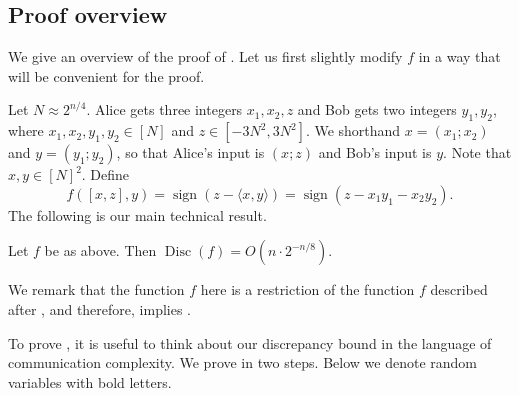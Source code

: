 \documentclass{toc}
\DeclareMathOperator{\Disc}{Disc}
\DeclareMathOperator{\sign}{sign}
\newcommand{\pair}[2]{( #1; #2 )}
\begin{document}
\subsection{Proof overview}
%
We give an overview of the proof of .  %
Let us first slightly modify $f$ in a way that will be convenient for the proof.

Let $N \approx 2^{n/4}$. Alice gets three integers $x_1,x_2,z$ and Bob gets two integers $y_1,y_2$, where $x_1,x_2,y_1,y_2 \in [N]$ and $z \in [-3N^2, 3N^2]$. We shorthand $x=\pair{x_1}{x_2}$ and $y=\pair{y_1}{y_2}$, so that Alice's input is $\pair{x}{z}$ and Bob's input is $y$. Note that $x,y \in [N]^2$.
Define
$$
f([x,z],y) =\sign(z-\langle x,y \rangle) = \sign(z - x_1 y_1 - x_2 y_2).
$$
The following is our main technical result.
\begin{theorem}
\label{thm:disc}
Let $f$ be as above. Then $\Disc(f) = O(n \cdot 2^{-n/8})$.
\end{theorem}

We remark that the function $f$ here is a restriction of the function $f$ described after , and therefore,  implies .

To prove , it is useful to think about our discrepancy bound in the language of communication complexity. We prove  in two steps. Below we denote random variables with bold letters.
\end{document}
